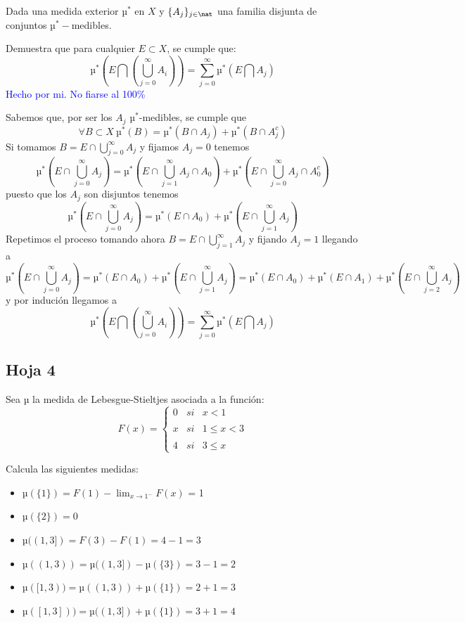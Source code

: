\begin{problem}[17]
Dada una medida exterior $µ^*$ en $X$ y $\{A_j\}_{j \in \nat}$ una familia disjunta de conjuntos $µ^*-$medibles.

Demuestra que para cualquier $E \subset X$, se cumple que:
\[µ^*(E \bigcap (\bigcup_{j=0}^{\infty} A_i))= \sum_{j=0}^{\infty}µ^*(E \bigcap A_j)\]
\solution
\textcolor{blue}{Hecho por mi. No fiarse al 100\%}

Sabemos que, por ser los $A_j$ $µ^*$-medibles, se cumple que
\[\forall B \subset X \ µ^*(B)=µ^*(B \cap A_j) + µ^*(B \cap A_j^c)\]
Si tomamos $B=E \cap \bigcup_{j=0}^{\infty}A_j$ y fijamos $A_j=0$ tenemos
\[µ^*(E \cap \bigcup_{j=0}^{\infty}A_j)=µ^*(E \cap \bigcup_{j=1}^{\infty}A_j \cap A_0) + µ^*(E \cap \bigcup_{j=0}^{\infty}A_j \cap A_0^c)\]
puesto que los $A_j$ son disjuntos tenemos
\[µ^*(E \cap \bigcup_{j=0}^{\infty}A_j)=µ^*(E \cap A_0) + µ^*(E \cap \bigcup_{j=1}^{\infty}A_j)\]
Repetimos el proceso tomando ahora $B=E \cap \bigcup_{j=1}^{\infty}A_j$ y fijando $A_j=1$ llegando a
\[µ^*(E \cap \bigcup_{j=0}^{\infty}A_j)=µ^*(E \cap A_0) + µ^*(E \cap \bigcup_{j=1}^{\infty}A_j) = µ^*(E \cap A_0) + µ^*(E \cap A_1) + µ^*(E \cap \bigcup_{j=2}^{\infty}A_j)\]
y por indución llegamos a
\[µ^*(E \bigcap (\bigcup_{j=0}^{\infty} A_i))= \sum_{j=0}^{\infty}µ^*(E \bigcap A_j)\]
\end{problem}





\subsection{Hoja 4}

\begin{problem}
Sea µ la medida de Lebesgue-Stieltjes asociada a la función:
\[F(x)=\left\{ \begin{array}{lcc}
             0 &   si  & x < 1 \\
             \\ x & si & 1 \leq x < 3 \\
             \\ 4 &  si  & 3 \leq x
             \end{array}
   \right.\]

Calcula las siguientes medidas:
\solution
\begin{itemize}
\item $µ(\{1\}) = F(1)-\displaystyle\lim_{x \to 1^-} F(x)$ = 1
\item $µ(\{2\}) = 0$
\item $µ((1, 3]) = F(3)-F(1) = 4 - 1 = 3$
\item $µ((1, 3)) = µ((1, 3]) - µ(\{3\}) = 3 - 1 = 2$
\item $µ([1, 3)) = µ((1, 3)) + µ(\{1\}) = 2 + 1 = 3$
\item $µ([1, 3])) = µ((1, 3]) + µ (\{1\}) = 3 + 1 = 4$
\end{itemize}
\end{problem}

